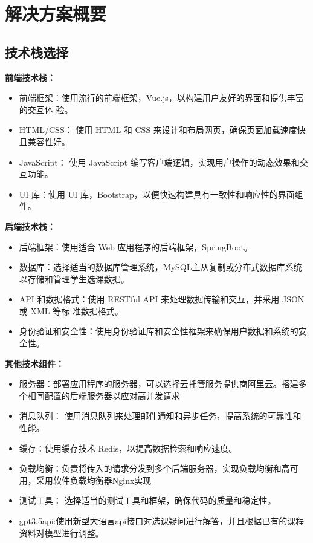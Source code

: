 \documentclass{article}
\begin{document}
\section{解决方案概要}
\subsection{技术栈选择}
\textbf{前端技术栈：}

\begin{itemize}
  \item 前端框架：使用流行的前端框架，Vue.js，以构建用户友好的界面和提供丰富的交互体
        验。
  \item HTML/CSS： 使用 HTML 和 CSS 来设计和布局网页，确保页面加载速度快且兼容性好。
  \item JavaScript： 使用 JavaScript 编写客户端逻辑，实现用户操作的动态效果和交互功能。
  \item UI 库：使用 UI 库，Bootstrap，以便快速构建具有一致性和响应性的界面组件。
\end{itemize}

\textbf{后端技术栈：}

\begin{itemize}
  \item 后端框架：使用适合 Web 应用程序的后端框架，SpringBoot。
  \item 数据库：选择适当的数据库管理系统，MySQL主从复制或分布式数据库系统 以存储和管理学生选课数据。
  \item API 和数据格式：使用 RESTful API 来处理数据传输和交互，并采用 JSON 或 XML 等标
        准数据格式。
  \item 身份验证和安全性：使用身份验证库和安全性框架来确保用户数据和系统的安全性。
\end{itemize}

\textbf{其他技术组件：}

\begin{itemize}
  \item 服务器：部署应用程序的服务器，可以选择云托管服务提供商阿里云。搭建多个相同配置的后端服务器以应对高并发请求
  \item 消息队列： 使用消息队列来处理邮件通知和异步任务，提高系统的可靠性和性能。
  \item 缓存：使用缓存技术 Redis，以提高数据检索和响应速度。
  \item 负载均衡：负责将传入的请求分发到多个后端服务器，实现负载均衡和高可用，采用软件负载均衡器Nginx实现
  \item 测试工具： 选择适当的测试工具和框架，确保代码的质量和稳定性。
  \item gpt3.5api:使用新型大语言api接口对选课疑问进行解答，并且根据已有的课程资料对模型进行调整。
\end{itemize}
\end{document}
